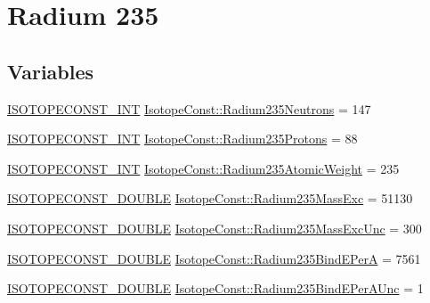 \hypertarget{group___isotope_const-_radium-_ra235}{}\section{Radium 235}
\label{group___isotope_const-_radium-_ra235}
\subsection*{Variables}
\begin{DoxyCompactItemize}
\item 
\mbox{\hyperlink{group___isotope_const-_macros_ga5f18360b3e99483a35c32d789e62621c}{I\+S\+O\+T\+O\+P\+E\+C\+O\+N\+S\+T\+\_\+\+I\+NT}} \mbox{\hyperlink{group___isotope_const-_radium-_ra235_ga190ef1508970c3277fc2eceacee808bd}{Isotope\+Const\+::\+Radium235\+Neutrons}} = 147
\item 
\mbox{\hyperlink{group___isotope_const-_macros_ga5f18360b3e99483a35c32d789e62621c}{I\+S\+O\+T\+O\+P\+E\+C\+O\+N\+S\+T\+\_\+\+I\+NT}} \mbox{\hyperlink{group___isotope_const-_radium-_ra235_gac52855d1a36ccca16411a4010726c1cf}{Isotope\+Const\+::\+Radium235\+Protons}} = 88
\item 
\mbox{\hyperlink{group___isotope_const-_macros_ga5f18360b3e99483a35c32d789e62621c}{I\+S\+O\+T\+O\+P\+E\+C\+O\+N\+S\+T\+\_\+\+I\+NT}} \mbox{\hyperlink{group___isotope_const-_radium-_ra235_ga5a1fb096c6a8e8e0d84bb8f12e847a39}{Isotope\+Const\+::\+Radium235\+Atomic\+Weight}} = 235
\item 
\mbox{\hyperlink{group___isotope_const-_macros_ga8f45a7272ce02c0b4c65c44636ed719a}{I\+S\+O\+T\+O\+P\+E\+C\+O\+N\+S\+T\+\_\+\+D\+O\+U\+B\+LE}} \mbox{\hyperlink{group___isotope_const-_radium-_ra235_gab62896a195a8e6386fb206d14ad80c7a}{Isotope\+Const\+::\+Radium235\+Mass\+Exc}} = 51130
\item 
\mbox{\hyperlink{group___isotope_const-_macros_ga8f45a7272ce02c0b4c65c44636ed719a}{I\+S\+O\+T\+O\+P\+E\+C\+O\+N\+S\+T\+\_\+\+D\+O\+U\+B\+LE}} \mbox{\hyperlink{group___isotope_const-_radium-_ra235_gaeff475d9584cd9aa247c904eb506cca8}{Isotope\+Const\+::\+Radium235\+Mass\+Exc\+Unc}} = 300
\item 
\mbox{\hyperlink{group___isotope_const-_macros_ga8f45a7272ce02c0b4c65c44636ed719a}{I\+S\+O\+T\+O\+P\+E\+C\+O\+N\+S\+T\+\_\+\+D\+O\+U\+B\+LE}} \mbox{\hyperlink{group___isotope_const-_radium-_ra235_gaad1e99345fdbcb7a228454149e6a40db}{Isotope\+Const\+::\+Radium235\+Bind\+E\+PerA}} = 7561
\item 
\mbox{\hyperlink{group___isotope_const-_macros_ga8f45a7272ce02c0b4c65c44636ed719a}{I\+S\+O\+T\+O\+P\+E\+C\+O\+N\+S\+T\+\_\+\+D\+O\+U\+B\+LE}} \mbox{\hyperlink{group___isotope_const-_radium-_ra235_ga3d1027aaada8ca080908a60b4bd456d5}{Isotope\+Const\+::\+Radium235\+Bind\+E\+Per\+A\+Unc}} = 1

\end{DoxyCompactItemize}
